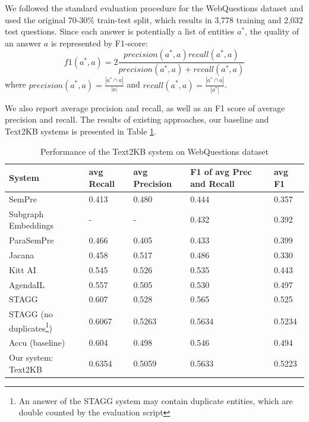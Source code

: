 
We followed the standard evaluation procedure for the WebQuestions dataset and used the original 70-30\% train-test split, which results in 3,778 training and 2,032 test questions.
Since each answer is potentially a list of entities $a^*$, the quality of an answer $a$ is represented by F1-score: 
$$f1(a^*, a) = 2\frac{precision(a^*,a) recall(a^*,a)}{precision(a^*,a) + recall(a^*,a)}$$
where $precision(a^*, a)=\frac{|a^* \cap a|}{|a|}$ and $recall(a^*, a) = \frac{|a^* \cap a|}{|a^*|}$.

We also report average precision and recall, as well as an F1 score of average precision and recall.
The results of existing approaches, our baseline and Text2KB systems is presented in Table \ref{table:webquestions_results}.

\begin{table}
\centering
\caption{Performance of the Text2KB system on WebQuestions dataset}
\label{table:webquestions_results}
\begin{tabular}{| p{5cm} | p{1.5cm} | p{1.5cm} | p{1.5cm} | p{1.5cm} | }
\hline
System & avg Recall & avg Precision & F1 of avg Prec and Recall & avg F1 \\
\hline
SemPre \cite{Berant:EMNLP13} & 0.413 & 0.480 & 0.444 & 0.357\\
Subgraph Embeddings \cite{BordesCW14:emnlp} & - & - & 0.432 & 0.392\\
ParaSemPre \cite{berant2014semantic} & 0.466 & 0.405 & 0.433 & 0.399\\
Jacana \cite{yao2014information} & 0.458 & 0.517 & 0.486 & 0.330\\
Kitt AI \cite{yao-scratch-qa-naacl2015} & 0.545 & 0.526 & 0.535 & 0.443\\
AgendaIL \cite{berant2015imitation} & 0.557 & 0.505 & 0.530 & 0.497\\
STAGG \cite{yih2015semantic} & 0.607 & 0.528 & 0.565 & 0.525\\
STAGG (no duplicates\footnote{An answer of the STAGG system may contain duplicate entities, which are double counted by the evaluation script}) \cite{yih2015semantic} & 0.6067 & 0.5263 & 0.5634 & 0.5234 \\
\hline
Accu (baseline) \cite{ACCU:2015} & 0.604 & 0.498 & 0.546 & 0.494\\
Our system: Text2KB & 0.6354 & 0.5059 & 0.5633 & 0.5223 \\
\hline
\end{tabular}
\end{table}

